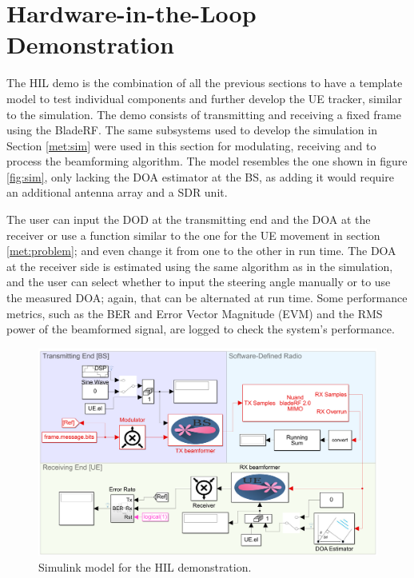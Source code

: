 \documentclass[12pt,a4paper]{report}
\begin{document}
\newpage
\section{Hardware-in-the-Loop Demonstration} \label{met:hil}
The HIL demo is the combination of all the previous sections to have a template model to test individual components and further develop the UE tracker, similar to the simulation. The demo consists of transmitting and receiving a fixed frame using the BladeRF. The same subsystems used to develop the simulation in Section \ref{met:sim} were used in this section for modulating, receiving and to process the beamforming algorithm. The model resembles the one shown in figure \ref{fig:sim}, only lacking the DOA estimator at the BS, as adding it would require an additional antenna array and a SDR unit. 

The user can input the DOD at the transmitting end and the DOA at the receiver or use a function similar to the one for the UE movement in section \ref{met:problem}; and even change it from one to the other in run time. The DOA at the receiver side is estimated using the same algorithm as in the simulation, and the user can select whether to input the steering angle manually or to use the measured DOA; again, that can be alternated at run time. Some performance metrics, such as the BER and Error Vector Magnitude (EVM) and the RMS power of the beamformed signal, are logged to check the system's performance.

\begin{figure}[h]
    \centering
    \includegraphics[width = \textwidth]{Figures/hil_demo.png}
    \caption{Simulink model for the HIL demonstration.}
    \label{fig:hil_demo}
\end{figure}
\end{document}
